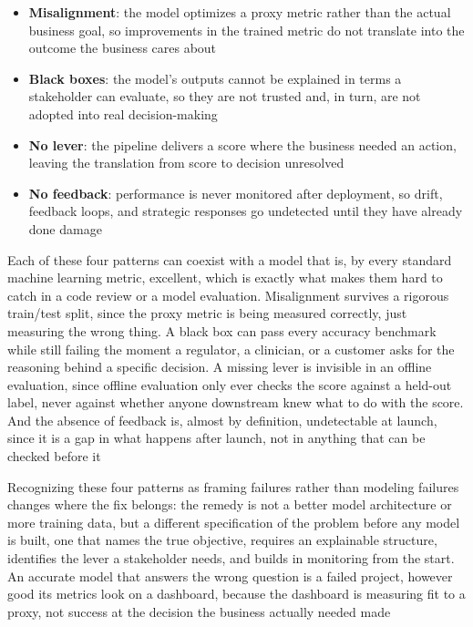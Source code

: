 \begin{itemize}
  \item \textbf{Misalignment}: the model optimizes a proxy metric rather than the
    actual business goal, so improvements in the trained metric do not translate
    into the outcome the business cares about

  \item \textbf{Black boxes}: the model's outputs cannot be explained in terms a
    stakeholder can evaluate, so they are not trusted and, in turn, are not
    adopted into real decision-making

  \item \textbf{No lever}: the pipeline delivers a score where the business needed
    an action, leaving the translation from score to decision unresolved

  \item \textbf{No feedback}: performance is never monitored after deployment,
    so drift, feedback loops, and strategic responses go undetected until they
    have already done damage
\end{itemize}

Each of these four patterns can coexist with a model that is, by every standard machine
learning metric, excellent, which is exactly what makes them hard to catch in a code
review or a model evaluation. Misalignment survives a rigorous train/test split,
since the proxy metric is being measured correctly, just measuring the wrong
thing. A black box can pass every accuracy benchmark while still failing the moment
a regulator, a clinician, or a customer asks for the reasoning behind a specific
decision. A missing lever is invisible in an offline evaluation, since offline evaluation
only ever checks the score against a held-out label, never against whether
anyone downstream knew what to do with the score. And the absence of feedback is,
almost by definition, undetectable at launch, since it is a gap in what happens
after launch, not in anything that can be checked before it

Recognizing these four patterns as framing failures rather than modeling
failures changes where the fix belongs: the remedy is not a better model architecture
or more training data, but a different specification of the problem before any
model is built, one that names the true objective, requires an explainable
structure, identifies the lever a stakeholder needs, and builds in monitoring
from the start. An accurate model that answers the wrong question is a failed project,
however good its metrics look on a dashboard, because the dashboard is measuring
fit to a proxy, not success at the decision the business actually needed made

